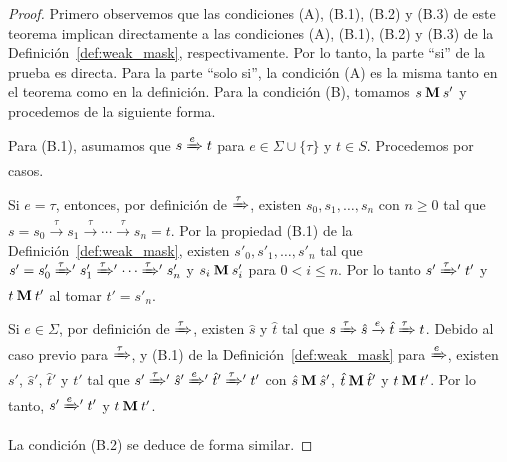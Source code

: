 \noindent
\begin{proof}
Primero observemos que las condiciones (A), (B.1), (B.2) y (B.3) de este teorema implican directamente a las condiciones (A), (B.1), (B.2) y (B.3) de la Definición~\ref{def:weak_mask}, respectivamente. Por lo tanto, la parte ``si'' de la prueba es directa. Para la parte ``solo si'', la condición (A) es la misma tanto en el teorema como en la definición.
Para la condición (B), tomamos $s \mathbin{\mathbf{M}} s'$ y procedemos de la siguiente forma.

Para (B.1), asumamos que $s \xRightarrow{e} t$ para $e \in \Sigma \cup \{\tau\}$ y $t \in S$.
Procedemos por casos.

Si $e = \tau$, entonces, por definición de $\xRightarrow{\tau}$, existen $s_0,s_1,\ldots,s_n$ con $n\geq0$ tal que $s=s_0\xrightarrow{\tau}s_1\xrightarrow{\tau}{\cdots}\xrightarrow{\tau}s_n=t$.
%
Por la propiedad (B.1) de la Definición~\ref{def:weak_mask}, existen $s'_0,s'_1,\ldots,s'_n$ tal que $s'=s'_0\mathrel{{\xRightarrow[]{\tau}}{}'}s'_1\mathrel{{\xRightarrow[]{\tau}}{}'}{\cdots}\mathrel{{\xRightarrow[]{\tau}}{}'}s'_n$ y $s_i \mathbin{\mathbf{M}} s'_i$ para $0<i\leq n$. Por lo tanto $s' \mathrel{{\xRightarrow[]{\tau}}{}'} t'$ y $t \mathbin{\mathbf{M}} t'$ al tomar $t'=s'_n$.

Si $e \in \Sigma$, por definición de $\xRightarrow{\tau}$, existen $\hat{s}$ y $\hat{t}$ tal que $s\xRightarrow{\tau}\hat{s}\xrightarrow{e}\hat{t}\xRightarrow{\tau}t$.
Debido al caso previo para $\xRightarrow{\tau}$, y (B.1) de la Definición~\ref{def:weak_mask} para $\xRightarrow{e}$, existen $s'$, $\hat{s}'$, $\hat{t}'$ y $t'$ tal que $s'\mathrel{{\xRightarrow[]{\tau}}{}'}\hat{s}'\mathrel{{\xRightarrow[]{e}}{}'}\hat{t}'\mathrel{{\xRightarrow[]{\tau}}{}'}t'$ con $\hat{s} \mathbin{\mathbf{M}} \hat{s}'$, $\hat{t} \mathbin{\mathbf{M}} \hat{t}'$ y $t \mathbin{\mathbf{M}} t'$.
Por lo tanto, $s'\mathrel{{\xRightarrow[]{e}}{}'}t'$ y $t \mathbin{\mathbf{M}} t'$.

La condición (B.2) se deduce de forma similar.


\end{proof}
